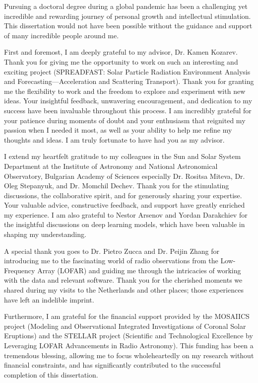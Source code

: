 Pursuing a doctoral degree during a global pandemic has been a challenging yet incredible and rewarding journey of personal growth and intellectual stimulation. This dissertation would not have been possible without the guidance and support of many incredible people around me.

First and foremost, I am deeply grateful to my advisor, Dr. Kamen Kozarev. Thank you for giving me the opportunity to work on such an interesting and exciting project (SPREADFAST: Solar Particle Radiation Environment Analysis and Forecasting—Acceleration and Scattering Transport). Thank you for granting me the flexibility to work and the freedom to explore and experiment with new ideas. Your insightful feedback, unwavering encouragement, and dedication to my success have been invaluable throughout this process. I am incredibly grateful for your patience during moments of doubt and your enthusiasm that reignited my passion when I needed it most, as well as your ability to help me refine my thoughts and ideas. I am truly fortunate to have had you as my advisor.

I extend my heartfelt gratitude to my colleagues in the Sun and Solar System Department at the Institute of Astronomy and National Astronomical Observatory, Bulgarian Academy of Sciences especially Dr. Rositsa Miteva, Dr. Oleg Stepanyuk, and Dr. Momchil Dechev. Thank you for the stimulating discussions, the collaborative spirit, and for generously sharing your expertise. Your valuable advice, constructive feedback, and support have greatly enriched my experience. I am also grateful to Nestor Arsenov and Yordan Darakchiev for the insightful discussions on deep learning models, which have been valuable in shaping my understanding.

A special thank you goes to Dr. Pietro Zucca and Dr. Peijin Zhang for introducing me to the fascinating world of radio observations from the Low-Frequency Array (LOFAR) and guiding me through the intricacies of working with the data and relevant software. Thank you for the cherished moments we shared during my visits to the Netherlands and other places; those experiences have left an indelible imprint.

Furthermore, I am grateful for the financial support provided by the MOSAIICS project (Modeling and Observational Integrated Investigations of Coronal Solar Eruptions) and the STELLAR project (Scientific and Technological Excellence by Leveraging LOFAR Advancements in Radio Astronomy). This funding has been a tremendous blessing, allowing me to focus wholeheartedly on my research without financial constraints, and has significantly contributed to the successful completion of this dissertation.

